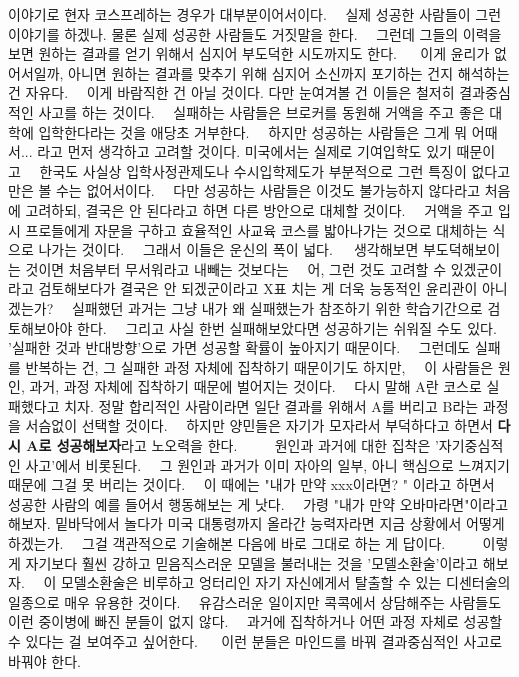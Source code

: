 이야기로 현자 코스프레하는 경우가 대부분이어서이다.   실제 성공한 사람들이 그런 이야기를 하겠나. 물론 실제 성공한 사람들도 거짓말을 한다.   그런데 그들의 이력을 보면 원하는 결과를 얻기 위해서 심지어 부도덕한 시도까지도 한다.    이게 윤리가 없어서일까, 아니면 원하는 결과를 맞추기 위해 심지어 소신까지 포기하는 건지 해석하는 건 자유다.   이게 바람직한 건 아닐 것이다. 다만 눈여겨볼 건 이들은 철저히 결과중심적인 사고를 하는 것이다.   실패하는 사람들은 브로커를 동원해 거액을 주고 좋은 대학에 입학한다라는 것을 애당초 거부한다.   하지만 성공하는 사람들은 그게 뭐 어때서... 라고 먼저 생각하고 고려할 것이다. 미국에서는 실제로 기여입학도 있기 때문이고   한국도 사실상 입학사정관제도나 수시입학제도가 부분적으로 그런 특징이 없다고만은 볼 수는 없어서이다.   다만 성공하는 사람들은 이것도 불가능하지 않다라고 처음에 고려하되, 결국은 안 된다라고 하면 다른 방안으로 대체할 것이다.   거액을 주고 입시 프로들에게 자문을 구하고 효율적인 사교육 코스를 밟아나가는 것으로 대체하는 식으로 나가는 것이다.   그래서 이들은 운신의 폭이 넓다.   생각해보면 부도덕해보이는 것이면 처음부터 무서워라고 내빼는 것보다는   어, 그런 것도 고려할 수 있겠군이라고 검토해보다가 결국은 안 되겠군이라고 X표 치는 게 더욱 능동적인 윤리관이 아니겠는가?   실패했던 과거는 그냥 내가 왜 실패했는가 참조하기 위한 학습기간으로 검토해보아야 한다.   그리고 사실 한번 실패해보았다면 성공하기는 쉬워질 수도 있다. '실패한 것과 반대방향'으로 가면 성공할 확률이 높아지기 때문이다.   그런데도 실패를 반복하는 건, 그 실패한 과정 자체에 집착하기 때문이기도 하지만,   이 사람들은 원인, 과거, 과정 자체에 집착하기 때문에 벌어지는 것이다.   다시 말해 A란 코스로 실패했다고 치자. 정말 합리적인 사람이라면 일단 결과를 위해서 A를 버리고 B라는 과정을 서슴없이 선택할 것이다.   하지만 양민들은 자기가 모자라서 부덕하다고 하면서 \textbf{다시 A로 성공해보자}라고 노오력을 한다.      원인과 과거에 대한 집착은 '자기중심적인 사고'에서 비롯된다.   그 원인과 과거가 이미 자아의 일부, 아니 핵심으로 느껴지기 때문에 그걸 못 버리는 것이다.   이 때에는 "내가 만약 xxx이라면? " 이라고 하면서 성공한 사람의 예를 들어서 행동해보는 게 낫다.   가령 "내가 만약 오바마라면"이라고 해보자. 밑바닥에서 놀다가 미국 대통령까지 올라간 능력자라면 지금 상황에서 어떻게 하겠는가.   그걸 객관적으로 기술해본 다음에 바로 그대로 하는 게 답이다.      이렇게 자기보다 훨씬 강하고 믿음직스러운 모델을 불러내는 것을 '모델소환술'이라고 해보자.   이 모델소환술은 비루하고 엉터리인 자기 자신에게서 탈출할 수 있는 디센터술의 일종으로 매우 유용한 것이다.   유감스러운 일이지만 콕콕에서 상담해주는 사람들도 이런 중이병에 빠진 분들이 없지 않다.   과거에 집착하거나 어떤 과정 자체로 성공할 수 있다는 걸 보여주고 싶어한다.    이런 분들은 마인드를 바꿔 결과중심적인 사고로 바꿔야 한다.






